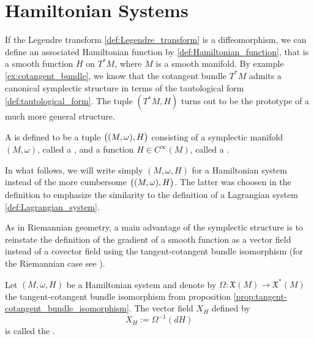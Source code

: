 \section*{Hamiltonian Systems}
If the Legendre transform \ref{def:Legendre_transform} is a diffeomorphism, we can define an associated Hamiltonian function by \ref{def:Hamiltonian_function}, that is a smooth function $H$ on $T^*M$, where $M$ is a smooth manifold. By example \ref{ex:cotangent_bundle}, we know that the cotangent bundle $T^*M$ admits a canonical symplectic structure in terms of the tautological form \ref{def:tautological_form}. The tuple $(T^*M,H)$ turns out to be the prototype of a much more general structure.

\begin{definition}
	A  is defined to be a tuple $\del[1]{(M,\omega),H}$ consisting of a symplectic manifold $(M,\omega)$, called a , and a function $H \in C^\infty(M)$, called a .
\end{definition}

\begin{remark}
	In what follows, we will write simply $(M,\omega,H)$ for a Hamiltonian system instead of the more cumbersome $\del[1]{(M,\omega),H}$. The latter was choosen in the definition to emphasize the similarity to the definition of a Lagrangian system \ref{def:Lagrangian_system}.
\end{remark}

As in Riemannian geometry, a main advantage of the symplectic structure is to reinstate the definition of the gradient of a smooth function as a vector field instead of a covector field using the tangent-cotangent bundle isomorphism (for the Riemannian case see \cite[342--343]{lee:smooth_manifolds:2013}).

\begin{definition}
	Let $(M,\omega,H)$ be a Hamiltonian system and denote by $\Omega : \mathfrak{X}(M) \to \mathfrak{X}^*(M)$ the tangent-cotangent bundle isomorphism from proposition \textup{\ref{prop:tangent-cotangent_bundle_isomorphism}}. The vector field $X_H$ defined by
	\begin{equation}
		\label{eq:Hamiltonian_vector_field}
		X_H := \Omega^{-1}(dH)
	\end{equation}
	\noindent is called the .
\end{definition}

